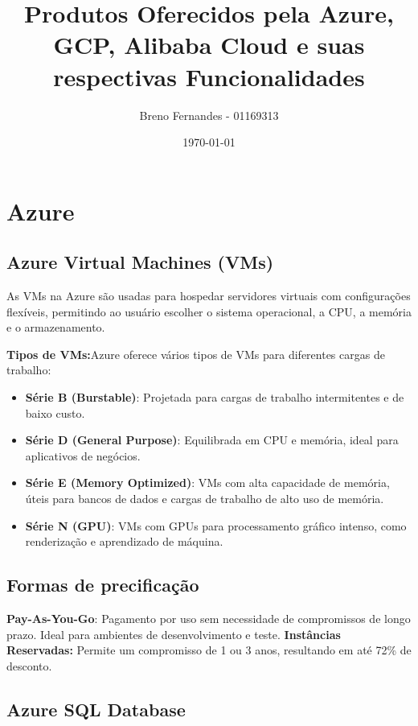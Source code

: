 \documentclass[a4paper,12pt]{article}
\title{Produtos Oferecidos pela Azure, GCP, Alibaba Cloud e suas respectivas Funcionalidades}
\author{Breno Fernandes - 01169313}
\date{\today}
\begin{document}
\maketitle

\break

\section*{Azure}

\subsection*{Azure Virtual Machines (VMs)}
As VMs na Azure são usadas para hospedar servidores virtuais com configurações flexíveis, permitindo ao usuário escolher o sistema operacional, a CPU, a memória e o armazenamento.

\textbf{Tipos de VMs:}Azure oferece vários tipos de VMs para diferentes cargas de trabalho:
\begin{itemize}[left=0pt]

\item \textbf{Série B (Burstable)}: Projetada para cargas de trabalho intermitentes e de baixo custo.
\item \textbf{Série D (General Purpose)}: Equilibrada em CPU e memória, ideal para aplicativos de negócios.
\item \textbf{Série E (Memory Optimized)}: VMs com alta capacidade de memória, úteis para bancos de dados e cargas de trabalho de alto uso de memória.
\item \textbf{Série N (GPU)}: VMs com GPUs para processamento gráfico intenso, como renderização e aprendizado de máquina.
  
\end{itemize}

\subsection*{Formas de precificação}

\textbf{Pay-As-You-Go}: Pagamento por uso sem necessidade de compromissos de longo prazo. Ideal para ambientes de desenvolvimento e teste.
\textbf{Instâncias Reservadas:} Permite um compromisso de 1 ou 3 anos, resultando em até 72\% de desconto.

\subsection*{Azure SQL Database}
\end{document}
